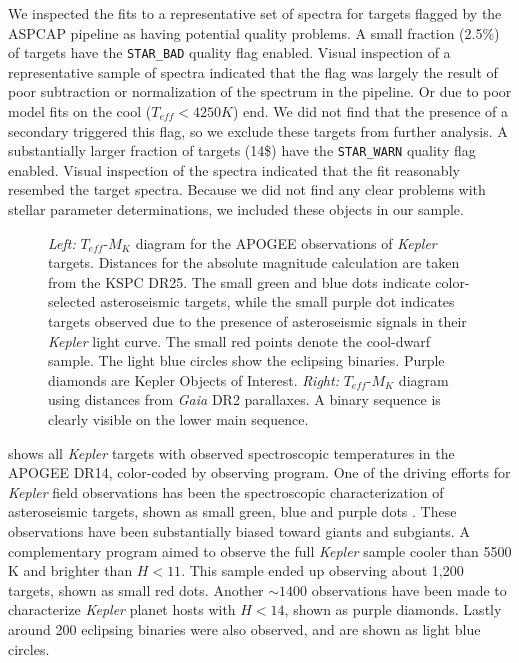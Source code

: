 \documentclass[manuscript]{aastex6}
\newcommand{\Kepler}{\mbox{\textit{Kepler}}}
\newcommand{\Gaia}{\mbox{\textit{Gaia}}}
\newcommand{\Teff}{\ensuremath{T_{eff}}}
\newcommand{\STARBAD}{\texttt{STAR\_BAD}}
\newcommand{\STARWARN}{\texttt{STAR\_WARN}}
\begin{document}
We inspected the fits to a representative set of spectra for targets flagged 
by the ASPCAP pipeline as having potential quality problems. A small fraction
(2.5\%) of targets have the \STARBAD{} quality flag enabled. Visual inspection
of a representative sample of spectra indicated that the flag was largely the
result of poor subtraction or normalization of the spectrum in the pipeline. Or
due to poor model fits on the cool (\(\Teff < 4250 K\)) end. We did not find
that the presence of a secondary triggered this flag, so we exclude these
targets from further analysis. A substantially larger fraction of targets
(14\$) have the \STARWARN{} quality flag enabled. Visual inspection of the
spectra indicated that the fit reasonably resembed the target spectra. Because
we did not find any clear problems with stellar parameter determinations, we 
included these objects in our sample.

\begin{figure}[htb]
    \centering
    \caption{\emph{Left:} \Teff-\(M_K\) diagram for the APOGEE observations of
        \Kepler{} targets. Distances for the absolute magnitude calculation are
        taken from the KSPC DR25. The small green and blue dots indicate
        color-selected asteroseismic targets, while the small purple dot
        indicates targets observed due to the presence of asteroseismic signals
        in their \Kepler{} light curve. The small red points denote the
        cool-dwarf sample. The light blue circles show the eclipsing binaries.
        Purple diamonds are Kepler Objects of Interest. \emph{Right:} 
        \Teff-\(M_K\) diagram using distances from \Gaia{} DR2 parallaxes. A binary sequence is clearly
visible on the lower main sequence.}\label{fig:apogee_selection}
\end{figure}

 shows all \Kepler{} targets with observed
spectroscopic temperatures in the APOGEE DR14, color-coded by observing
program. One of the driving efforts for \Kepler{} field observations has been
the spectroscopic characterization of asteroseismic targets, shown as small
green, blue and purple dots \citep{Zasowski17,Pinsonneault18}. These
observations have been substantially biased toward giants and subgiants. A
complementary program aimed to observe the full \Kepler{} sample cooler than
5500 K and brighter than \(H < 11\). This sample ended up observing about 1,200
targets, shown as small red dots. Another \(\sim 1400\) observations have been
made to characterize \Kepler{} planet hosts with \(H < 14\), shown as purple
diamonds. Lastly around 200 eclipsing binaries \citep{Prsa11,Slawson11} were
also observed, and are shown as light blue circles.
\end{document}
